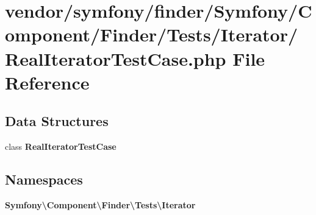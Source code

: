 \section{vendor/symfony/finder/\+Symfony/\+Component/\+Finder/\+Tests/\+Iterator/\+Real\+Iterator\+Test\+Case.php File Reference}
\label{_real_iterator_test_case_8php}
\subsection*{Data Structures}
\begin{DoxyCompactItemize}
\item 
class {\bf Real\+Iterator\+Test\+Case}
\end{DoxyCompactItemize}
\subsection*{Namespaces}
\begin{DoxyCompactItemize}
\item 
 {\bf Symfony\textbackslash{}\+Component\textbackslash{}\+Finder\textbackslash{}\+Tests\textbackslash{}\+Iterator}
\end{DoxyCompactItemize}
